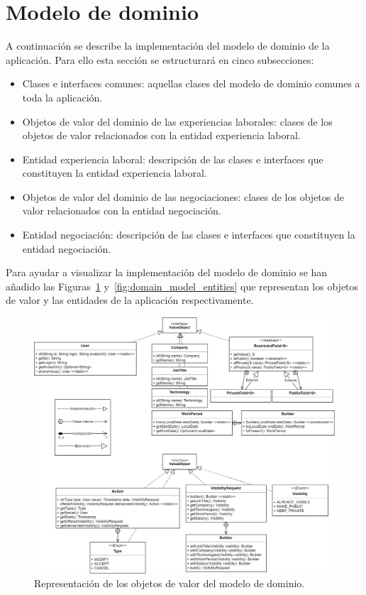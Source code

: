 \documentclass[a4paper, 12pt]{book}
\begin{document}
    \section{Modelo de dominio}
    \label{sec:domain_model_impl}
    A continuación se describe la implementación del modelo de dominio de la aplicación. Para ello esta sección se estructurará en cinco subsecciones:

    \begin{itemize}
        \item Clases e interfaces comunes: aquellas clases del modelo de dominio comunes a toda la aplicación.
        \item Objetos de valor del dominio de las experiencias laborales: clases de los objetos de valor relacionados con la entidad experiencia laboral.
        \item Entidad experiencia laboral: descripción de las clases e interfaces que constituyen la entidad experiencia laboral.
        \item Objetos de valor del dominio de las negociaciones: clases de los objetos de valor relacionados con la entidad negociación.
        \item Entidad negociación: descripción de las clases e interfaces que constituyen la entidad negociación.
    \end{itemize}

    Para ayudar a visualizar la implementación del modelo de dominio se han añadido las Figuras~\ref{fig:domain_model_vo} y~\ref{fig:domain_model_entities} que representan los objetos de valor y las entidades de la aplicación respectivamente.

    \begin{figure}
        \centering
        \includegraphics[width=15cm, keepaspectratio]{img/Modelo_dominio_vo.png}
        \caption{Representación de los objetos de valor del modelo de dominio.}\label{fig:domain_model_vo}
    \end{figure}
\end{document}
